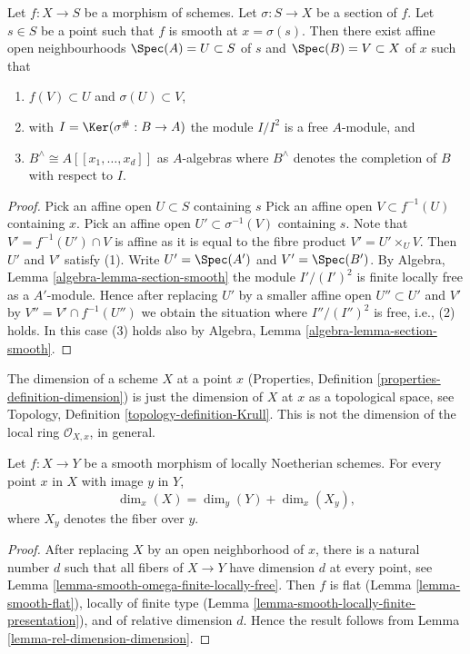 \begin{lemma}
\label{lemma-section-smooth-morphism}
Let $f : X \to S$ be a morphism of schemes.
Let $\sigma : S \to X$ be a section of $f$.
Let $s \in S$ be a point such that $f$ is smooth at $x = \sigma(s)$.
Then there exist affine open neighbourhoods
$\Spec(A) = U \subset S$ of $s$ and $\Spec(B) = V \subset X$
of $x$ such that
\begin{enumerate}
\item $f(V) \subset U$ and $\sigma(U) \subset V$,
\item with $I = \Ker(\sigma^\# : B \to A)$ the module $I/I^2$
is a free $A$-module, and
\item $B^\wedge \cong A[[x_1, \ldots, x_d]]$ as $A$-algebras where
$B^\wedge$ denotes the completion of $B$ with respect to $I$.
\end{enumerate}
\end{lemma}

\begin{proof}
Pick an affine open $U \subset S$ containing $s$
Pick an affine open $V \subset f^{-1}(U)$ containing $x$.
Pick an affine open $U' \subset \sigma^{-1}(V)$ containing $s$.
Note that $V' = f^{-1}(U') \cap V$ is affine as it is equal to the
fibre product $V' = U' \times_U V$. Then $U'$ and $V'$ satisfy (1).
Write $U' = \Spec(A')$ and $V' = \Spec(B')$. By
Algebra, Lemma \ref{algebra-lemma-section-smooth}
the module $I'/(I')^2$ is finite locally free as a $A'$-module.
Hence after replacing $U'$ by a smaller affine open $U'' \subset U'$
and $V'$ by $V'' = V' \cap f^{-1}(U'')$ we obtain the situation where
$I''/(I'')^2$ is free, i.e., (2) holds. In this case (3) holds also by
Algebra, Lemma \ref{algebra-lemma-section-smooth}.
\end{proof}

\noindent
The dimension of a scheme $X$ at a point $x$
(Properties, Definition \ref{properties-definition-dimension})
is just the dimension of $X$ at $x$ as a topological space, see
Topology, Definition \ref{topology-definition-Krull}.
This is not the dimension of the local ring $\mathcal{O}_{X,x}$, in general.

\begin{lemma}
\label{lemma-smoothness-dimension}
Let $f \colon X \to Y$ be a smooth morphism of locally Noetherian schemes.
For every point $x$ in $X$ with image $y$ in $Y$,
$$
\dim_x(X) = \dim_y(Y) + \dim_x(X_y),
$$
where $X_y$ denotes the fiber over $y$.
\end{lemma}

\begin{proof}
After replacing $X$ by an open neighborhood of $x$,
there is a natural number $d$ such that all fibers
of $X \to Y$ have dimension $d$ at every point, see
Lemma \ref{lemma-smooth-omega-finite-locally-free}.
Then $f$ is flat (Lemma \ref{lemma-smooth-flat}),
locally of finite type (Lemma \ref{lemma-smooth-locally-finite-presentation}),
and of relative dimension $d$. Hence the result follows from
Lemma \ref{lemma-rel-dimension-dimension}.
\end{proof}













